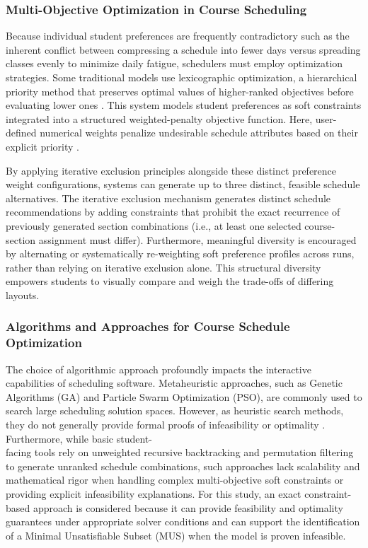 \documentclass{icsthesis}
\begin{document}
\begin{mainmatter}
		\subsubsection{Multi-Objective Optimization in Course Scheduling}
		Because individual student preferences are frequently contradictory such as the inherent conflict between compressing a schedule into fewer days versus spreading classes evenly to minimize daily fatigue, schedulers must employ optimization strategies. Some traditional models use lexicographic optimization, a hierarchical priority method that preserves optimal values of higher-ranked objectives before evaluating lower ones \citep{rossi2006}. This system models student preferences as soft constraints integrated into a structured weighted-penalty objective function. Here, user-defined numerical weights penalize undesirable schedule attributes based on their explicit priority \citep{meier2026}.
		
		By applying iterative exclusion principles alongside these distinct preference weight configurations, systems can generate up to three distinct, feasible schedule alternatives. The iterative exclusion mechanism generates distinct schedule recommendations by adding constraints that prohibit the exact recurrence of previously generated section combinations (i.e., at least one selected course-section assignment must differ). Furthermore, meaningful diversity is encouraged by alternating or systematically re-weighting soft preference profiles across runs, rather than relying on iterative exclusion alone. This structural diversity empowers students to visually compare and weigh the trade-offs of differing layouts.
		
		\subsubsection{Algorithms and Approaches for Course Schedule Optimization}
		The choice of algorithmic approach profoundly impacts the interactive capabilities of scheduling software. Metaheuristic approaches, such as Genetic Algorithms (GA) and Particle Swarm Optimization (PSO), are commonly used to search large scheduling solution spaces. However, as heuristic search methods, they do not generally provide formal proofs of infeasibility or optimality \citep{cruzrosales2022}. Furthermore, while basic student-\\facing tools rely on unweighted recursive backtracking and permutation filtering to generate unranked schedule combinations, such approaches lack scalability and mathematical rigor when handling complex multi-objective soft constraints or providing explicit infeasibility explanations. For this study, an exact constraint-based approach is considered because it can provide feasibility and optimality guarantees under appropriate solver conditions and can support the identification of a Minimal Unsatisfiable Subset (MUS) when the model is proven infeasible.
		

\end{mainmatter}
\end{document}
